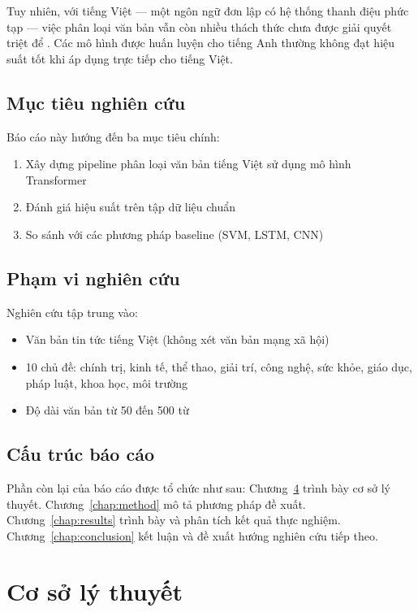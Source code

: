 \documentclass[12pt, a4paper]{report}
\begin{document}
Tuy nhiên, với tiếng Việt --- một ngôn ngữ đơn lập có hệ thống thanh điệu
phức tạp --- việc phân loại văn bản vẫn còn nhiều thách thức chưa được
giải quyết triệt để \cite{Le2024bert}. Các mô hình được huấn luyện cho
tiếng Anh thường không đạt hiệu suất tốt khi áp dụng trực tiếp cho tiếng Việt.

\section{Mục tiêu nghiên cứu}

Báo cáo này hướng đến ba mục tiêu chính:

\begin{enumerate}
  \item Xây dựng pipeline phân loại văn bản tiếng Việt sử dụng mô hình Transformer
  \item Đánh giá hiệu suất trên tập dữ liệu chuẩn
  \item So sánh với các phương pháp baseline (SVM, LSTM, CNN)
\end{enumerate}

\section{Phạm vi nghiên cứu}

Nghiên cứu tập trung vào:
\begin{itemize}
  \item Văn bản tin tức tiếng Việt (không xét văn bản mạng xã hội)
  \item 10 chủ đề: chính trị, kinh tế, thể thao, giải trí, công nghệ,
        sức khỏe, giáo dục, pháp luật, khoa học, môi trường
  \item Độ dài văn bản từ 50 đến 500 từ
\end{itemize}

\section{Cấu trúc báo cáo}

Phần còn lại của báo cáo được tổ chức như sau:
Chương~\ref{chap:theory} trình bày cơ sở lý thuyết.
Chương~\ref{chap:method} mô tả phương pháp đề xuất.
Chương~\ref{chap:results} trình bày và phân tích kết quả thực nghiệm.
Chương~\ref{chap:conclusion} kết luận và đề xuất hướng nghiên cứu tiếp theo.

\chapter{Cơ sở lý thuyết}
\label{chap:theory}
\end{document}
